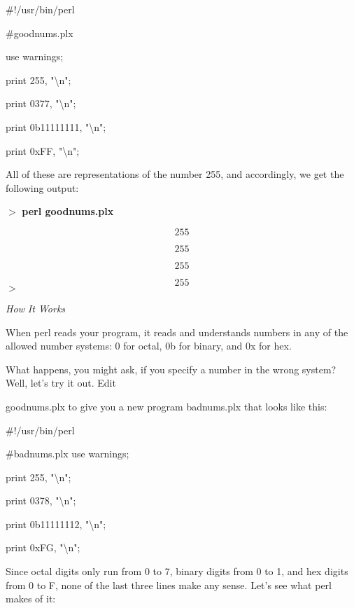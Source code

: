 \documentclass[a4paper,11pt]{book}
\begin{document}
\noindent \#!/usr/bin/perl

\noindent \#goodnums.plx

\noindent use warnings;

\noindent print 255, "\textbackslash n";

\noindent print 0377, "\textbackslash n";

\noindent print 0b11111111, "\textbackslash n";

\noindent print 0xFF, "\textbackslash n";

\noindent 

\noindent All of these are representations of the number 255, and accordingly, we get the following output:

\noindent 

\noindent $>$ \textbf{perl goodnums.plx}

\[255\] 

\[255\] 

\[255\] 

\[255\] 
$>$

\noindent 

\noindent \textit{How It Works}

\noindent When perl reads your program, it reads and understands numbers in any of the allowed number systems: 0 for octal, 0b for binary, and 0x for hex.

\noindent 

\noindent What happens, you might ask, if you specify a number in the wrong system? Well, let's try it out. Edit

\noindent goodnums.plx to give you a new program badnums.plx that looks like this:

\noindent 

\noindent 

\noindent \#!/usr/bin/perl

\noindent \#badnums.plx use warnings;

\noindent print 255, "\textbackslash n";

\noindent print 0378, "\textbackslash n";

\noindent print 0b11111112, "\textbackslash n";

\noindent print 0xFG, "\textbackslash n";

\noindent 

\noindent Since octal digits only run from 0 to 7, binary digits from 0 to 1, and hex digits from 0 to F, none of the last three lines make any sense. Let's see what perl makes of it:

\noindent 
\end{document}
